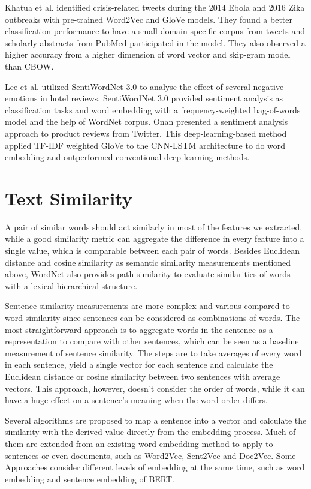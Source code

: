 Khatua et al.\cite{khatua2019} identified crisis-related tweets during the 2014 Ebola and 2016 Zika outbreaks with pre-trained Word2Vec and GloVe models.
They found a better classification performance to have a small domain-specific corpus from tweets and scholarly abstracts from PubMed participated in the model.
They also observed a higher accuracy from a higher dimension of word vector and skip-gram model than CBOW.

Lee et al.\cite{lee2017} utilized SentiWordNet 3.0 to analyse the effect of several negative emotions in hotel reviews.
SentiWordNet 3.0\cite{baccianella2010} provided sentiment analysis as classification tasks and word embedding with a frequency-weighted bag-of-words model and the help of WordNet corpus.
Onan\cite{onan2021} presented a sentiment analysis approach to product reviews from Twitter.
This deep-learning-based method applied TF-IDF weighted GloVe to the CNN-LSTM architecture to do word embedding and outperformed conventional deep-learning methods.


\section{Text Similarity}
A pair of similar words should act similarly in most of the features we extracted, while a good similarity metric can aggregate the difference in every feature into a single value, which is comparable between each pair of words.
Besides Euclidean distance and cosine similarity as semantic similarity measurements mentioned above, WordNet also provides path similarity to evaluate similarities of words with a lexical hierarchical structure.

Sentence similarity measurements are more complex and various compared to word similarity since sentences can be considered as combinations of words.
The most straightforward approach is to aggregate words in the sentence as a representation to compare with other sentences, which can be seen as a baseline measurement of sentence similarity.
The steps are to take averages of every word in each sentence, yield a single vector for each sentence and calculate the Euclidean distance or cosine similarity between two sentences with average vectors.
This approach, however, doesn't consider the order of words, while it can have a huge effect on a sentence's meaning when the word order differs.

Several algorithms are proposed to map a sentence into a vector and calculate the similarity with the derived value directly from the embedding process.
Much of them are extended from an existing word embedding method to apply to sentences or even documents, such as Word2Vec, Sent2Vec and Doc2Vec.
Some Approaches consider different levels of embedding at the same time, such as word embedding and sentence embedding of BERT.

